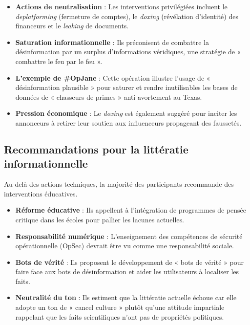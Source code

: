 \begin{itemize}
	\item \textbf{Actions de neutralisation} : Les interventions privilégiées incluent le \textit{deplatforming} (fermeture de comptes), le \textit{doxing} (révélation d'identité) des financeurs et le \textit{leaking} de documents.
	\item \textbf{Saturation informationnelle} : Ils préconisent de combattre la désinformation par un surplus d'informations véridiques, une stratégie de « combattre le feu par le feu ».
	\item \textbf{L'exemple de \#OpJane} : Cette opération illustre l'usage de « désinformation plausible » pour saturer et rendre inutilisables les bases de données de « chasseurs de primes » anti-avortement au Texas.
	\item \textbf{Pression économique} : Le \textit{doxing} est également suggéré pour inciter les annonceurs à retirer leur soutien aux influenceurs propageant des faussetés.
\end{itemize}

\subsection{Recommandations pour la littératie informationnelle}

Au-delà des actions techniques, la majorité des participants recommande des interventions éducatives.

\begin{itemize}
	\item \textbf{Réforme éducative} : Ils appellent à l'intégration de programmes de pensée critique dans les écoles pour pallier les lacunes actuelles.
	\item \textbf{Responsabilité numérique} : L'enseignement des compétences de sécurité opérationnelle (OpSec) devrait être vu comme une responsabilité sociale.
	\item \textbf{Bots de vérité} : Ils proposent le développement de « bots de vérité » pour faire face aux bots de désinformation et aider les utilisateurs à localiser les faits.
	\item \textbf{Neutralité du ton} : Ils estiment que la littératie actuelle échoue car elle adopte un ton de « cancel culture » plutôt qu'une attitude impartiale rappelant que les faits scientifiques n'ont pas de propriétés politiques.
\end{itemize}
